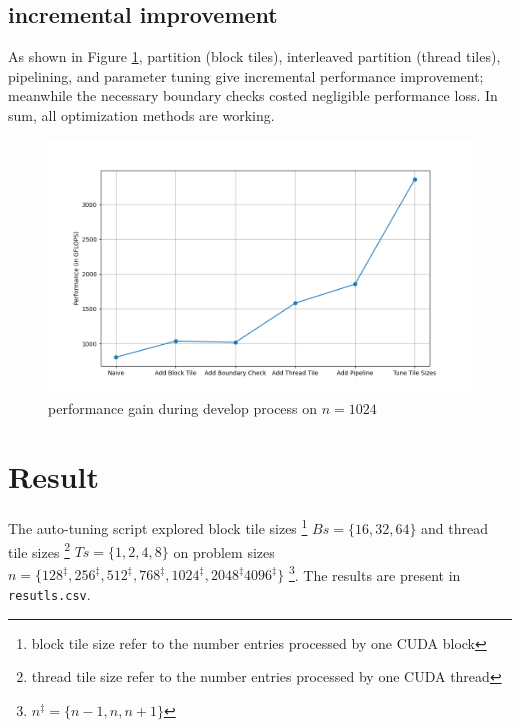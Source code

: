 \documentclass{article}
\begin{document}
\subsection{incremental improvement}
As shown in Figure \ref{fig:develop-process}, 
partition (block tiles), interleaved partition (thread tiles), pipelining, and parameter tuning 
give incremental performance improvement;
meanwhile the necessary boundary checks costed negligible performance loss.
In sum, all optimization methods are working.

\begin{figure}[h]
    \centering
    \includegraphics[width=\linewidth]{img/develop_process.png}
    \caption{performance gain during develop process on $n=1024$}
    \label{fig:develop-process}
\end{figure}

\newpage
\section{Result}

The auto-tuning script explored block tile sizes
\footnote{block tile size refer to the number entries processed by one CUDA block}
$Bs = \{16, 32, 64\}$
and thread tile sizes 
\footnote{thread tile size refer to the number entries processed by one CUDA thread}
$Ts = \{1,2,4,8\}$
on problem sizes $n = \{128^{\ddagger} , 256^{\ddagger}, 512^{\ddagger}, 768^{\ddagger}, 1024^{\ddagger}, 2048^{\ddagger} 4096^{\ddagger}\}$
\footnote{$n^{\ddagger} = \{n-1, n, n+1\}$}.
The results are present in \texttt{resutls.csv}.
\end{document}
